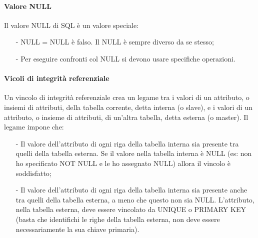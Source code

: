 \documentclass[a4paper, 10pt]{report}
\begin{document}
\paragraph*{Valore NULL} Il valore NULL di SQL è un valore speciale:
\begin{itemize}
\item[-] NULL = NULL è falso. Il NULL è sempre diverso da se stesso;
\item[-] Per eseguire confronti col NULL si devono usare specifiche operazioni.
\end{itemize}

\paragraph*{Vicoli di integrità referenziale} Un vincolo di integrità referenziale crea un legame tra i valori di un attributo, o insiemi di attributi, della tabella corrente, detta interna (o slave), e i valori di un attributo, o insieme di attributi, di un'altra tabella, detta esterna (o master). Il legame impone che:
\begin{itemize}
\item[-] Il valore dell'attributo di ogni riga della tabella interna sia presente tra quelli della tabella esterna. Se il valore nella tabella interna è NULL (es: non ho specificato NOT NULL e le ho assegnato NULL) allora il vincolo è soddisfatto;
\item[-] Il valore dell'attributo di ogni riga della tabella interna sia presente anche tra quelli della tabella esterna, a meno che questo non sia NULL. L'attributo, nella tabella esterna, deve essere vincolato da UNIQUE o PRIMARY KEY (basta che identifichi le righe della tabella esterna, non deve essere necessariamente la sua chiave primaria).
\end{itemize}
\end{document}
